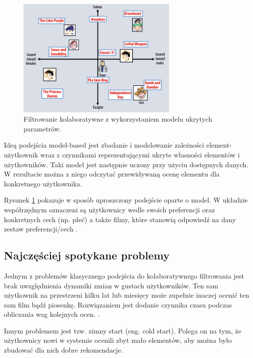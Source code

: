 \documentclass[twoside]{iisthesis}
\begin{document}
	  \begin{figure}[!ht] 
	  	\centering
	  	\includegraphics[width=0.7\textwidth]{cf2}
	  	\caption{Filtrowanie kolaboratywne z wykorzystaniem modelu ukrytych parametrów\protect\cite{koren2009matrix}.}
	  	\label{fig:cf2}
	  \end{figure}
	 
	 Ideą podejścia model-based jest zbadanie i modelowanie zależności element-użytkownik wraz z czynnikami reprezentującymi ukryte własności elementów i użytkowników. Taki model jest następnie uczony przy użyciu dostępnych danych. W rezultacie można z niego odczytać przewidywaną ocenę elementu dla konkretnego użytkownika\cite{id:ComprehensiveSurveyOfNeighborhoodBasedRecommendationMethods}\cite{id:AdvancesInCollaborativeFiltering}.
	 
	 Rysunek \ref{fig:cf2} pokazuje w sposób uproszczony podejście oparte o model. W układzie współrzędnym oznaczeni są użytkownicy wedle swoich preferencji oraz konkretnych cech (np. płeć) a także filmy, które stanowią odpowiedź na dany zestaw preferencji/cech \cite{koren2009matrix}. 
	 	 
	 \subsection{Najczęściej spotykane problemy}
	 
	 Jednym z problemów klasycznego podejścia do kolaboratywnego filtrowania jest brak uwzględnienia dynamiki zmian w gustach użytkowników. Ten sam użytkownik na przestrzeni kilku lat lub miesięcy może zupełnie inaczej ocenić ten sam film bądź piosenkę. Rozwiązaniem jest dodanie czynnika czasu podczas obliczania wag kolejnych ocen. \cite{id:NewRecommentationAlgoritmBasedOnSocialNetwork}\cite{id:NextSongRecommendationWithTemporalDynamics}\cite{koren2009matrix}.
	 
	 Innym problemem jest tzw. zimny start (eng. cold start). Polega on na tym, że użytkownicy nowi w systemie ocenili zbyt mało elementów, aby można było zbudować dla nich dobre rekomendacje\cite{id:zhang2015hybrid}\cite{id:RubensRecSysHB2010}.
	 
\end{document}
